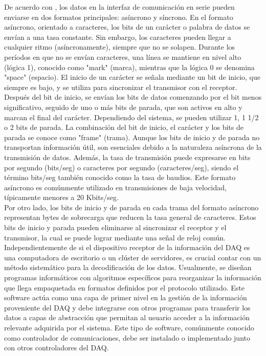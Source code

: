 \documentclass[]{book}
\begin{document}
 \noindent De acuerdo con \cite{eeeguide_serial_communication_8251}, los datos en la interfaz de comunicación en serie pueden enviarse en dos formatos principales: asíncrono y síncrono. En el formato asíncrono, orientado a caracteres, los bits de un carácter o palabra de datos se envían a una tasa constante. Sin embargo, los caracteres pueden llegar a cualquier ritmo (asíncronamente), siempre que no se solapen. Durante los períodos en que no se envían caracteres, una línea se mantiene en nivel alto (lógica 1), conocido como "mark" (marca), mientras que la lógica 0 se denomina "space" (espacio). El inicio de un carácter se señala mediante un bit de inicio, que siempre es bajo, y se utiliza para sincronizar el transmisor con el receptor. Después del bit de inicio, se envían los bits de datos comenzando por el bit menos significativo, seguido de uno o más bits de parada, que son activos en alto y marcan el final del carácter. Dependiendo del sistema, se pueden utilizar 1, 1 1/2 o 2 bits de parada. La combinación del bit de inicio, el carácter y los bits de parada se conoce como "frame" (trama). Aunque los bits de inicio y de parada no transportan información útil, son esenciales debido a la naturaleza asíncrona de la transmisión de datos. Además, la tasa de transmisión puede expresarse en bits por segundo (bits/seg) o caracteres por segundo (caracteres/seg), siendo el término bits/seg también conocido como la tasa de baudios. Este formato asíncrono es comúnmente utilizado en transmisiones de baja velocidad, típicamente menores a 20 Kbits/seg.\\

\noindent Por otro lado, los bits de inicio y de parada en cada trama del formato asíncrono representan bytes de sobrecarga que reducen la tasa general de caracteres. Estos bits de inicio y parada pueden eliminarse al sincronizar el receptor y el transmisor, la cual se puede lograr mediante una señal de reloj común.\\

\noindent Independientemente de si el dispositivo receptor de la información del DAQ es una computadora de escritorio o un clúster de servidores, es crucial contar con un método sistemático para la decodificación de los datos. Usualmente, se diseñan programas informáticos con algoritmos específicos para reorganizar la información que llega empaquetada en formatos definidos por el protocolo utilizado. Este software actúa como una capa de primer nivel en la gestión de la información proveniente del DAQ y debe integrarse con otros programas para transferir los datos a capas de abstracción que permitan al usuario acceder a la información relevante adquirida por el sistema. Este tipo de software, comúnmente conocido como controlador de comunicaciones, debe ser instalado o implementado junto con otros controladores del DAQ.
\end{document}
